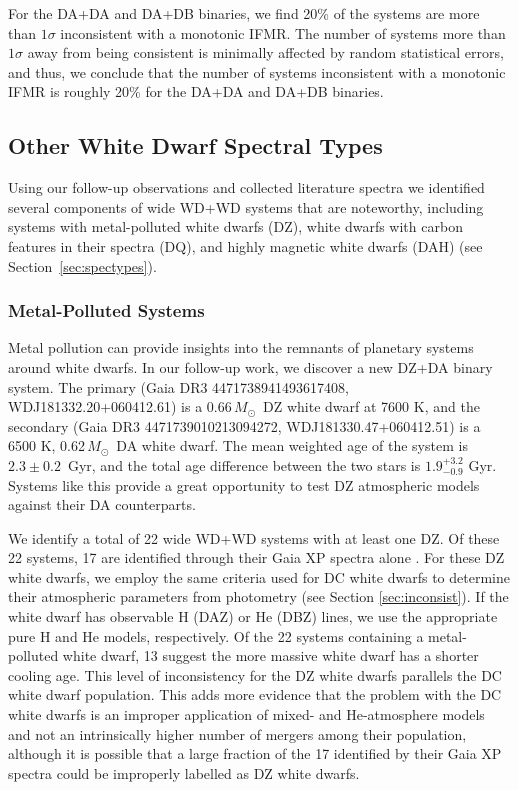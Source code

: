 \documentclass[twocolumn]{aastex631}
\newcommand{\msun}{$M_{\odot}$}
\begin{document}
For the DA+DA and DA+DB binaries, we find 20\% of the systems are more than $1\sigma$ inconsistent with a monotonic IFMR. The number of systems more than $1\sigma$ away from being consistent is minimally affected by random statistical errors, and thus, we conclude that the number of systems inconsistent with a monotonic IFMR is roughly 20\% for the DA+DA and DA+DB binaries.

\subsection{Other White Dwarf Spectral Types}
Using our follow-up observations and collected literature spectra we identified several components of wide WD+WD systems that are noteworthy, including systems with metal-polluted white dwarfs (DZ), white dwarfs with carbon features in their spectra (DQ), and highly magnetic white dwarfs (DAH) (see Section~\ref{sec:spectypes}).

\subsubsection{Metal-Polluted Systems}
Metal pollution can provide insights into the remnants of planetary systems around white dwarfs. In our follow-up work, we discover a new DZ+DA binary system. The primary (Gaia DR3 4471738941493617408, WDJ181332.20+060412.61) is a 0.66\,\msun\ DZ white dwarf at 7600 K, and the secondary (Gaia DR3 4471739010213094272, WDJ181330.47+060412.51) is a 6500 K, 0.62\,\msun\ DA white dwarf. The mean weighted age of the system is $2.3\pm0.2$~Gyr, and the total age difference between the two stars is $1.9^{+3.2}_{-0.9}$ Gyr. Systems like this provide a great opportunity to test DZ atmospheric models against their DA counterparts.

We identify a total of 22 wide WD+WD systems with at least one DZ. Of these 22 systems, 17 are identified through their Gaia XP spectra alone \citep{2024A&A...682A...5V}. For these DZ white dwarfs, we employ the same criteria used for DC white dwarfs to determine their atmospheric parameters from photometry (see Section \ref{sec:inconsist}). If the white dwarf has observable H (DAZ) or He (DBZ) lines, we use the appropriate pure H and He models, respectively. Of the 22 systems containing a metal-polluted white dwarf, 13 suggest the more massive white dwarf has a shorter cooling age. This level of inconsistency for the DZ white dwarfs parallels the DC white dwarf population. This adds more evidence that the problem with the DC white dwarfs is an improper application of mixed- and He-atmosphere models and not an intrinsically higher number of mergers among their population, although it is possible that a large fraction of the 17 identified by their Gaia XP spectra could be improperly labelled as DZ white dwarfs.
\end{document}
